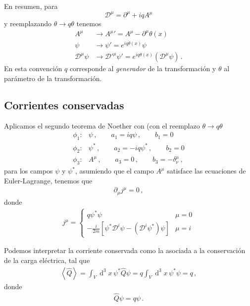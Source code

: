\begin{subappendices}
\begin{frame}
  En resumen, para 
\begin{equation}
  \mathcal{D}^\mu=\partial^\mu+iqA^\mu
\end{equation}
y reemplazando $\theta\to q\theta$ tenemos
\begin{align}
\label{eq:tfgl}
   A^\mu&\to{A^\mu}'=A^\mu-\partial^\mu\theta(x)\\
   \psi&\to \psi'=e^{iq\theta(x)}\psi\nonumber\\
  \mathcal{D}^\mu\psi&\to {\mathcal{D}'}^\mu\psi'=e^{iq\theta(x)}(\mathcal{D}^\mu\psi)\,.
\end{align}
En esta convención $q$ corresponde al \emph{generador} de la transformación y $\theta$ al parámetro de la transformación.
\end{frame}


\subsection{Corrientes conservadas}
\label{ref:cc}
\begin{frame}
Aplicamos el segundo teorema de Noether con (con el reemplazo $\theta\to q\theta$
\begin{align}
\label{eq:dpa}
  \phi_{1}:& \psi\,,\qquad a_{1}=iq \psi \,,\qquad b_1=0\nonumber\\
  \phi_{2}:& \psi^{*}\,,\qquad a_{2}=-iq\psi^{*}\,,\qquad b_2=0 \nonumber\\
  \phi_{3}:& A^{\mu}\,,\qquad a_{3}=0\,,\qquad b_3=-\delta^{\mu}_{\nu}\,,
\end{align}
para los campos $\psi$ y $\psi^{*}$, asumiendo que el campo $A^{\mu}$ satisface las ecuaciones de Euler-Lagrange, tenemos que
\begin{align}
  \partial_{\mu}j^{\mu}=0\,,
\end{align}
donde
\begin{align}
  j^{\mu}=
  \begin{cases}
q \psi^{*}\psi & \mu=0\\
-\frac{i}{2m} \left[ \psi^{*}\mathcal{D}^i\psi-\left( \mathcal{D}^i\psi^{*} \right)\psi \right] & \mu=i
  \end{cases}
\end{align}

Podemos interpretar la corriente conservada como la asociada a la conservación de la carga eléctrica, tal que
\begin{align}
  \left\langle \widehat{Q} \right\rangle =\int_{V}\operatorname{d}^3x\, \psi^{*} \widehat{Q} \psi=q\int_{V}\operatorname{d}^3x\, \psi^{*} \psi=q\,,
\end{align}
donde
\begin{align}
  \widehat{Q} \psi=q\psi\,.
\end{align}



\end{frame}
\end{subappendices}
